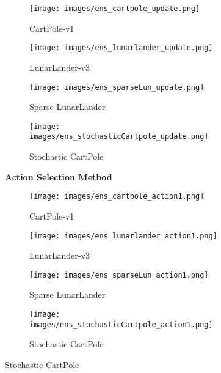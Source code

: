 \documentclass[11pt,a4paper]{report}
\begin{document}
{\begin{figure}[ht]
  \begin{subfigure}[b]{0.24\textwidth}
    \centering
    \texttt{[image: images/ens\_cartpole\_update.png]}
    \caption{CartPole‐v1} %
  \end{subfigure}
  \hfill %
  \begin{subfigure}[b]{0.24\textwidth}
    \centering
    \texttt{[image: images/ens\_lunarlander\_update.png]}
    \caption{LunarLander‐v3} %
  \end{subfigure}
  \hfill %
   \begin{subfigure}[b]{0.24\textwidth}
    \centering
    \texttt{[image: images/ens\_sparseLun\_update.png]}
    \caption{Sparse LunarLander} %
  \end{subfigure}
  \hfill %
  \begin{subfigure}[b]{0.24\textwidth}
    \centering
    \texttt{[image: images/ens\_stochasticCartpole\_update.png]}
    \caption{Stochastic CartPole} %
  \end{subfigure}

  \vspace{1em} %

  \par\noindent\textbf{Action Selection Method}\par\nopagebreak
  \vspace{0.5em} %

   \begin{subfigure}[b]{0.24\textwidth}
    \centering
    \texttt{[image: images/ens\_cartpole\_action1.png]}
    \caption{CartPole‐v1} %
   \end{subfigure}
   \hfill %
   \begin{subfigure}[b]{0.24\textwidth}
    \centering
    \texttt{[image: images/ens\_lunarlander\_action1.png]}
    \caption{LunarLander‐v3} %
   \end{subfigure}
   \hfill %
     \begin{subfigure}[b]{0.24\textwidth}
    \centering
    \texttt{[image: images/ens\_sparseLun\_action1.png]}
    \caption{Sparse LunarLander} %
   \end{subfigure}
   \hfill %
   \begin{subfigure}[b]{0.24\textwidth}
    \centering
    \texttt{[image: images/ens\_stochasticCartpole\_action1.png]}
    \caption{Stochastic CartPole} %
   \end{subfigure}


\end{figure}}
\end{document}
